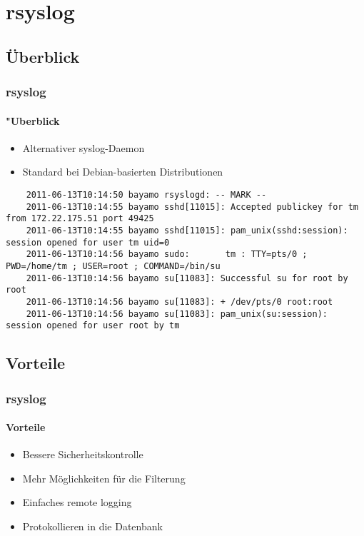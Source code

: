 \section{rsyslog}
\subsection{Überblick}
\begin{frame}[fragile]
	\frametitle{rsyslog}
	\framesubtitle{"Uberblick}
	\begin{itemize}
		\item Alternativer syslog-Daemon
		\item Standard bei Debian-basierten Distributionen
	\end{itemize}
	\begin{center}
		\begin{block}{}
			\begin{tiny}
				\begin{verbatim}
	2011-06-13T10:14:50 bayamo rsyslogd: -- MARK --
	2011-06-13T10:14:55 bayamo sshd[11015]: Accepted publickey for tm from 172.22.175.51 port 49425
	2011-06-13T10:14:55 bayamo sshd[11015]: pam_unix(sshd:session): session opened for user tm uid=0
	2011-06-13T10:14:56 bayamo sudo:       tm : TTY=pts/0 ; PWD=/home/tm ; USER=root ; COMMAND=/bin/su
	2011-06-13T10:14:56 bayamo su[11083]: Successful su for root by root
	2011-06-13T10:14:56 bayamo su[11083]: + /dev/pts/0 root:root
	2011-06-13T10:14:56 bayamo su[11083]: pam_unix(su:session): session opened for user root by tm
				\end{verbatim}
			\end{tiny}
		\end{block}
	\end{center}
\end{frame}

\subsection{Vorteile}
\begin{frame}
	\frametitle{rsyslog}
	\framesubtitle{Vorteile}
	\begin{itemize}
		\item Bessere Sicherheitskontrolle
		\item Mehr Möglichkeiten für die Filterung
		\item Einfaches remote logging
		\item Protokollieren in die Datenbank
	\end{itemize}
\end{frame}

